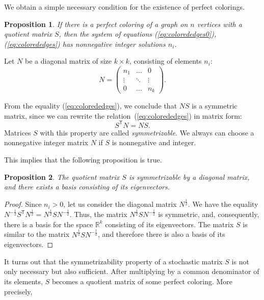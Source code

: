 \documentclass[11pt]{article}
\newtheorem{claim}{Proposition}[section]
\theoremstyle{definition}
\begin{document}
We obtain a simple necessary condition for the existence of perfect colorings.
{
\begin{claim}\label{s:integer}
If there is a perfect coloring of a graph on $n$ vertices with a quotient matrix
$S$, then the system of equations (\ref{eq:colorededges0}), (\ref{eq:colorededges}) has
nonnegative integer solutions $n_i$.
\end{claim}
}

Let $N$ be a diagonal matrix of size $k\times k$, consisting of
elements $n_i$:
$$
N=
\begin{pmatrix}
n_1 & \ldots & 0\\
\vdots & \ddots & \vdots\\
0 & \ldots & n_k
\end{pmatrix}.
$$

From the equality (\ref{eq:colorededges}), we  conclude that $NS$
is a symmetric matrix, since we can rewrite the relation~(\ref{eq:colorededges}) in matrix form:
\[
\label{eq:matrixcolledges} S^{\mathsf T}N=NS.
\]
Matrices $S$ with this property are called {\sl symmetrizable}.
We  always can choose  a nonnegative integer   matrix $N$ if $S$ is nonnegative and
integer.

This implies that the following proposition is true.
\begin{claim}\label{s:S_sym}
The quotient matrix $S$  is symmetrizable
by a diagonal matrix, and there exists a basis consisting of  its eigenvectors.
 \end{claim}
\begin{proof}
Since $n_i>0$, let us consider the diagonal matrix
$N^{\frac12}$. We have the equality
$N^{-\frac12}S^{\mathsf T}N^{\frac12}=N^{\frac12}SN^{-\frac12}$.
Thus, the matrix $N^{\frac12}SN^{-\frac12}$ is symmetric, and,
consequently, there is a basis for the space $\mathbb{R}^k$ consisting
of its eigenvectors. The matrix $S$ is similar to the matrix
$N^{\frac12}SN^{-\frac12}$, and therefore there is also a basis of its
eigenvectors. \end{proof}

It turns out that the symmetrizability property of a stochastic matrix $S$ is not only necessary but also sufficient.  After multiplying by a common denominator
of its elements, $S$  becomes  a quotient matrix of some perfect coloring. More precisely, 
\end{document}
